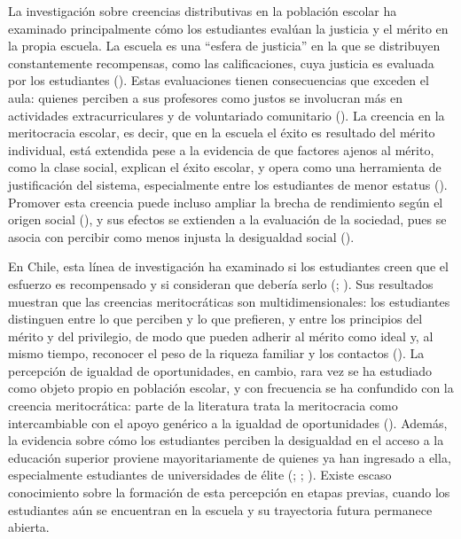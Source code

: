\documentclass[
  spanish,
  a4paper,
  oneside]{scrbook}
\begin{document}
La investigación sobre creencias distributivas en la población escolar
ha examinado principalmente cómo los estudiantes evalúan la justicia y
el mérito en la propia escuela. La escuela es una ``esfera de justicia''
en la que se distribuyen constantemente recompensas, como las
calificaciones, cuya justicia es evaluada por los estudiantes
(). Estas evaluaciones tienen
consecuencias que exceden el aula: quienes perciben a sus profesores
como justos se involucran más en actividades extracurriculares y de
voluntariado comunitario (). La creencia en la meritocracia escolar, es decir, que
en la escuela el éxito es resultado del mérito individual, está
extendida pese a la evidencia de que factores ajenos al mérito, como la
clase social, explican el éxito escolar, y opera como una herramienta de
justificación del sistema, especialmente entre los estudiantes de menor
estatus (). Promover esta creencia puede incluso ampliar la brecha de
rendimiento según el origen social
(), y sus efectos
se extienden a la evaluación de la sociedad, pues se asocia con percibir
como menos injusta la desigualdad social
().

En Chile, esta línea de investigación ha examinado si los estudiantes
creen que el esfuerzo es recompensado y si consideran que debería serlo
(; ). Sus
resultados muestran que las creencias meritocráticas son
multidimensionales: los estudiantes distinguen entre lo que perciben y
lo que prefieren, y entre los principios del mérito y del privilegio, de
modo que pueden adherir al mérito como ideal y, al mismo tiempo,
reconocer el peso de la riqueza familiar y los contactos
(). La percepción de
igualdad de oportunidades, en cambio, rara vez se ha estudiado como
objeto propio en población escolar, y con frecuencia se ha confundido
con la creencia meritocrática: parte de la literatura trata la
meritocracia como intercambiable con el apoyo genérico a la igualdad de
oportunidades ().
Además, la evidencia sobre cómo los estudiantes perciben la desigualdad
en el acceso a la educación superior proviene mayoritariamente de
quienes ya han ingresado a ella, especialmente estudiantes de
universidades de élite (; ; ). Existe escaso conocimiento sobre la formación de esta percepción
en etapas previas, cuando los estudiantes aún se encuentran en la
escuela y su trayectoria futura permanece abierta.
\end{document}
